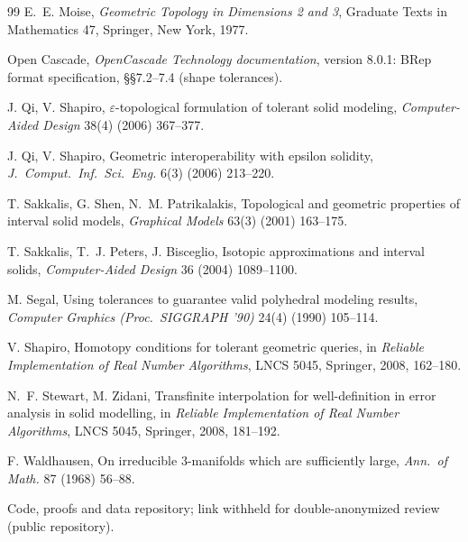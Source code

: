 \documentclass[preprint,12pt]{elsarticle}
\theoremstyle{definition}
\theoremstyle{remark}
\begin{document}
\begin{thebibliography}{99}
 E.~E. Moise, \emph{Geometric Topology in Dimensions 2 and 3}, Graduate Texts in Mathematics 47,
Springer, New York, 1977.

 Open Cascade, \emph{OpenCascade Technology documentation}, version 8.0.1: BRep format specification,
\S\S7.2--7.4 (shape tolerances).

 J. Qi, V. Shapiro, $\varepsilon$-topological formulation of tolerant solid modeling,
\emph{Computer-Aided Design} 38(4) (2006) 367--377.

 J. Qi, V. Shapiro, Geometric interoperability with epsilon solidity, \emph{J.\ Comput.\ Inf.\
Sci.\ Eng.} 6(3) (2006) 213--220.

 T. Sakkalis, G. Shen, N.~M. Patrikalakis, Topological and geometric properties of interval solid
models, \emph{Graphical Models} 63(3) (2001) 163--175.

 T. Sakkalis, T.~J. Peters, J. Bisceglio, Isotopic approximations and interval solids,
\emph{Computer-Aided Design} 36 (2004) 1089--1100.

 M. Segal, Using tolerances to guarantee valid polyhedral modeling results, \emph{Computer
Graphics (Proc.\ SIGGRAPH '90)} 24(4) (1990) 105--114.

 V. Shapiro, Homotopy conditions for tolerant geometric queries, in \emph{Reliable Implementation
of Real Number Algorithms}, LNCS 5045, Springer, 2008, 162--180.

 N.~F. Stewart, M. Zidani, Transfinite interpolation for well-definition in error analysis in solid
modelling, in \emph{Reliable Implementation of Real Number Algorithms}, LNCS 5045, Springer, 2008, 181--192.

 F. Waldhausen, On irreducible 3-manifolds which are sufficiently large, \emph{Ann.\ of
Math.} 87 (1968) 56--88.

 Code, proofs and data repository; link withheld for double-anonymized review
(public repository).

\end{thebibliography}
\end{document}
